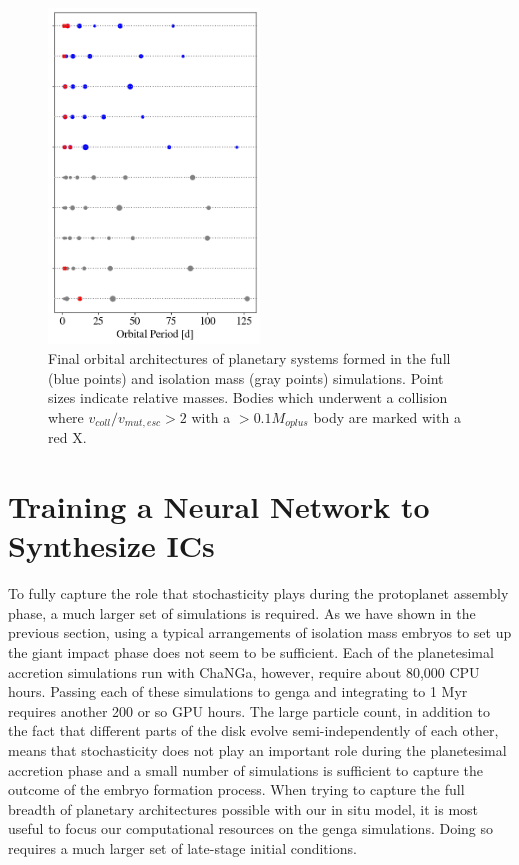 \begin{figure}
\begin{center}
    \includegraphics[width=0.5\textwidth]{figures/stip/architectures_iso_comp.png}
    \caption{Final orbital architectures of planetary systems formed in the full (blue points) and isolation mass (gray points) simulations. Point sizes indicate relative masses. Bodies which underwent a collision where $v_{coll}/v_{mut,esc} > 2$ with a $> 0.1 M_{oplus}$ body are marked with a red X.\label{fig:architectures_iso_comp}}
\end{center}
\end{figure}

\section{Training a Neural Network to Synthesize ICs} \label{sec:neuralICs}

To fully capture the role that stochasticity plays during the protoplanet assembly phase, a much larger set of simulations is required. As we have shown in the previous section, using a typical arrangements of isolation mass embryos to set up the giant impact phase does not seem to be sufficient. Each of the planetesimal accretion simulations run with {\sc ChaNGa}, however, require about 80,000 CPU hours. Passing each of these simulations to {\sc genga} and integrating to 1 Myr requires another 200 or so GPU hours. The large particle count, in addition to the fact that different parts of the disk evolve semi-independently of each other, means that stochasticity does not play an important role during the planetesimal accretion phase and a small number of simulations is sufficient to capture the outcome of the embryo formation process. When trying to capture the full breadth of planetary architectures possible with our in situ model, it is most useful to focus our computational resources on the {\sc genga} simulations. Doing so requires a much larger set of late-stage initial conditions.

